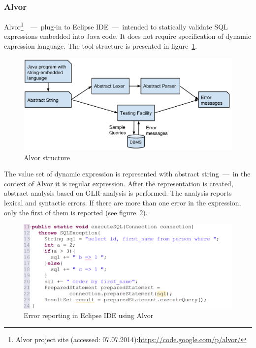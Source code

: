 \documentclass{acm_proc_article-sp}
\begin{document}
\subsubsection{Alvor}

Alvor\footnote{Alvor project site (accessed: 07.07.2014):\url{https://code.google.com/p/alvor/}}~\cite{ALVOR1}~---~plug-in to Eclipse IDE~---~intended to statically validate SQL expressions embedded into Java code. It does not require specification of dynamic expression language. The tool structure is presented in figure~\ref{alvor_structure}.

\begin{figure}[h!]
    \begin{center}
        \includegraphics[scale=0.4]{graphics/Alvor.pdf}
    \end{center}
    \caption{Alvor structure}
    \label{alvor_structure}
\end{figure}

The value set of dynamic expression is represented with abstract string~---~in the context of Alvor it is regular expression. After the representation is created, abstract analysis based on GLR-analysis is performed. The analysis reports lexical and syntactic errors. If there are more than one error in the expression, only the first of them is reported (see figure~\ref{ex_alvor}).


\begin{figure}[h!]
    \begin{center}
        \includegraphics[scale=0.27]{graphics/ex_alvor.png}
    \end{center}
    \caption{Error reporting in Eclipse IDE using Alvor}
    \label{ex_alvor}
\end{figure}
\end{document}
